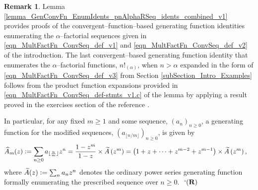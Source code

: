 \documentclass[12pt,reqno]{article}
\numberwithin{sfootnote}{section}
\numberwithin{equation}{section}
\theoremstyle{DefaultTheoremStyle}
\theoremstyle{definition}
\newtheorem{remark}[theorem]{Remark}
\newcommand{\eolqedsymbol}[1]{{\hrulefill\ensuremath{\ #1}}}
\renewcommand{\eolqedsymbol}[1]{{\mboxfill{ }\ensuremath{\ #1}}}
\newcommand{\RemarkQEDSymbol}{`(\text{\rm{\bf R}})}
\newcommand{\RemarkQED}{\eolqedsymbol{\RemarkQEDSymbol}}
\newcommand{\defequals}{\ensuremath{\vcentcolon=}}
\newcommand{\MultiFactorial}[2]{\ensuremath{#1!_{\left(#2\right)}}}
\begin{document}
\begin{remark} 
Lemma \ref{lemma_GenConvFn_EnumIdents_pnAlphaRSeq_idents_combined_v1} 
provides proofs of the convergent--function--based 
generating function identities enumerating the $\alpha$--factorial 
sequences given in 
\eqref{eqn_MultFactFn_ConvSeq_def_v1} and 
\eqref{eqn_MultFactFn_ConvSeq_def_v2} of the introduction. 
The last convergent--based generating function identity that enumerates the 
$\alpha$--factorial functions, $\MultiFactorial{n}{\alpha}$, when 
$n > \alpha$ expanded in the form of 
\eqref{eqn_MultFactFn_ConvSeq_def_v3} from 
Section \ref{subSection_Intro_Examples} 
follows from the product function expansions provided in 
\eqref{eqn_MultFactFn_ConvSeq_def-stmts_v1.c} of the lemma by 
applying a result proved in the exercises section of the reference 
\citep[\S 7, Ex.\ 7.36; p.\ 569]{GKP}. 

In particular, for any fixed $m \geq 1$ and some sequence, 
$\left(a_n\right)_{n \geq 0}$, a generating function for the 
modified sequences, $\left(a_{\lfloor n/m \rfloor}\right)_{n \geq 0}$, is 
given by 
\begin{align*} 
\widehat{A}_m(z) & \defequals 
     \sum_{n \geq 0} a_{\lfloor \frac{n}{m} \rfloor} z^{n} = 
     \frac{1-z^{m}}{1-z} \times \widetilde{A}\left(z^{m}\right) = 
     \left(1 + z + \cdots + z^{m-2} + z^{m-1}\right) \times 
     \widetilde{A}\left(z^{m}\right), 
\end{align*} 
where $\widetilde{A}(z) \defequals \sum_{n} a_n z^{n}$ denotes the 
ordinary power series generating function formally enumerating the 
prescribed sequence over $n \geq 0$. 
\RemarkQED 
\end{remark} 
\end{document}

